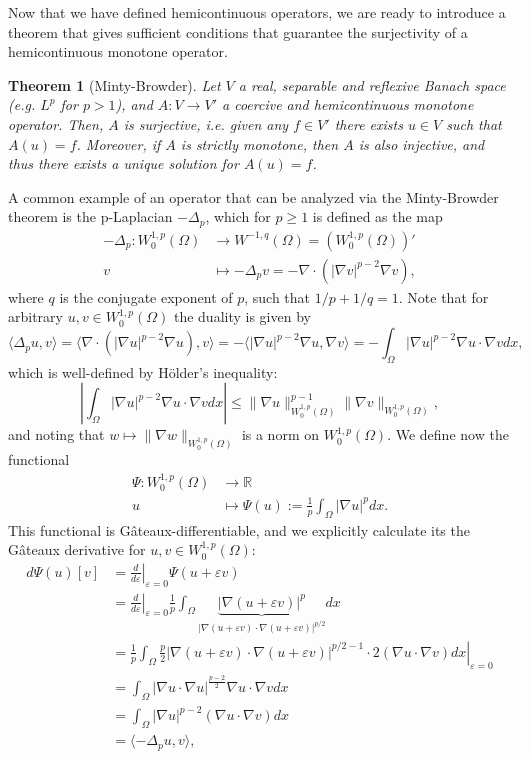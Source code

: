 \documentclass{article}
\newcommand{\R}{\mathbb{R}}
\newtheorem{theorem}{Theorem}
\begin{document}
Now that we have defined hemicontinuous operators, we are ready to introduce a theorem that gives sufficient conditions that guarantee the surjectivity of a hemicontinuous monotone operator.
\begin{theorem}[Minty-Browder]
    Let $V$ a real, separable and reflexive Banach space (e.g. $L^p$ for $p>1$), and $A:V\to V'$ a coercive and hemicontinuous monotone operator. Then, $A$ is surjective, i.e. given any $f\in V'$ there exists $u\in V$ such that $A(u)=f$. Moreover, if $A$ is strictly monotone, then $A$ is also injective, and thus there exists a unique solution for $A(u)=f$.
\end{theorem}
A common example of an operator that can be analyzed via the Minty-Browder theorem is the p-Laplacian $-\Delta_p$, which for $p\geq 1$ is defined as the map
\begin{align*}
    -\Delta_p : W_0^{1,p}(\Omega)&\to W^{-1,q}(\Omega) = (W_0^{1,p}(\Omega))'\\
    v&\mapsto -\Delta_p v = -\nabla\cdot(|\nabla v|^{p-2}\nabla v),
\end{align*}
where $q$ is the conjugate exponent of $p$, such that $1/p + 1/q = 1$. Note that for arbitrary $u,v\in W_0^{1,p}(\Omega)$ the duality is given by 
\begin{equation*}
    \langle \Delta_p u, v\rangle = \langle \nabla\cdot (|\nabla u|^{p-2}\nabla u), v\rangle = -\langle |\nabla u|^{p-2}\nabla u, \nabla v\rangle = -\int_\Omega |\nabla u|^{p-2}\nabla u\cdot\nabla v dx,
\end{equation*}
which is well-defined by Hölder's inequality:
\begin{equation*}
    \left|\int_\Omega |\nabla u|^{p-2}\nabla u\cdot\nabla v dx\right| \leq \|\nabla u\|^{p-1}_{W_0^{1,p}(\Omega)}\|\nabla v\|_{W_0^{1,p}(\Omega)},
\end{equation*}
and noting that $w\mapsto \|\nabla w\|_{W_0^{1,p}(\Omega)}$ is a norm on $W_0^{1,p}(\Omega)$. We define now the functional
\begin{align*}
    \Psi:W_0^{1,p}(\Omega)&\to \R\\
    u&\mapsto \Psi(u):= \frac{1}{p}\int_\Omega |\nabla u|^p dx.
\end{align*}
This functional is Gâteaux-differentiable, and we explicitly calculate its the Gâteaux derivative for $u,v\in W_0^{1,p}(\Omega)$:
\begin{align*}
    d\Psi(u)[v] &= \left.\frac{d}{d\varepsilon}\right|_{\varepsilon=0} \Psi(u+\varepsilon v)\\
    &= \left.\frac{d}{d\varepsilon}\right|_{\varepsilon=0} \frac{1}{p}\int_\Omega \underbrace{|\nabla (u+\varepsilon v)|^p}_{|\nabla(u+\varepsilon v)\cdot \nabla(u+\varepsilon v)|^{p/2}} dx\\
    &= \left.\frac{1}{p}\int_\Omega \frac{p}{2} |\nabla (u+\varepsilon v)\cdot\nabla(u+\varepsilon v)|^{p/2-1}\cdot 2(\nabla u\cdot\nabla v) dx\right|_{\varepsilon = 0}\\
    &= \int_\Omega |\nabla u\cdot\nabla u|^{\frac{p-2}{2}}\nabla u\cdot\nabla v dx\\
    &= \int_\Omega |\nabla u|^{p-2}(\nabla u\cdot\nabla v) dx\\
    &= \langle -\Delta_p u, v\rangle,
\end{align*}
\end{document}
